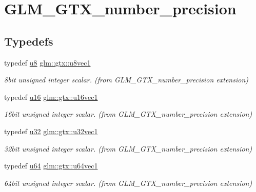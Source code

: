 \hypertarget{group__gtx__number__precision}{}\section{G\+L\+M\+\_\+\+G\+T\+X\+\_\+number\+\_\+precision}
\label{group__gtx__number__precision}
\subsection*{Typedefs}
\begin{DoxyCompactItemize}
\item 
typedef \mbox{\hyperlink{group__gtc__type__precision_ga5e3dc67373d5068997d2d9f41c9024d2}{u8}} \mbox{\hyperlink{group__gtx__number__precision_ga35ae7849593a354420e4f52d1b36c2d6}{glm\+::gtx\+::u8vec1}}
\begin{DoxyCompactList}\small\item\em 8bit unsigned integer scalar. (from G\+L\+M\+\_\+\+G\+T\+X\+\_\+number\+\_\+precision extension) \end{DoxyCompactList}\item 
typedef \mbox{\hyperlink{group__gtc__type__precision_gae7a1571503f83d2264ddfa705a6b082a}{u16}} \mbox{\hyperlink{group__gtx__number__precision_ga807d7e5f24e981b1575bd40ca159781d}{glm\+::gtx\+::u16vec1}}
\begin{DoxyCompactList}\small\item\em 16bit unsigned integer scalar. (from G\+L\+M\+\_\+\+G\+T\+X\+\_\+number\+\_\+precision extension) \end{DoxyCompactList}\item 
typedef \mbox{\hyperlink{group__gtc__type__precision_ga54e837745059fd29017bed71cfa0a8db}{u32}} \mbox{\hyperlink{group__gtx__number__precision_gac46a7890b20928df83e734c3ea9557d4}{glm\+::gtx\+::u32vec1}}
\begin{DoxyCompactList}\small\item\em 32bit unsigned integer scalar. (from G\+L\+M\+\_\+\+G\+T\+X\+\_\+number\+\_\+precision extension) \end{DoxyCompactList}\item 
typedef \mbox{\hyperlink{group__gtc__type__precision_ga71cedd4972f9cb1a5e14dfe5ab83ecd7}{u64}} \mbox{\hyperlink{group__gtx__number__precision_ga92812a1d7e746bcaba61d2f5a64afc52}{glm\+::gtx\+::u64vec1}}
\begin{DoxyCompactList}\small\item\em 64bit unsigned integer scalar. (from G\+L\+M\+\_\+\+G\+T\+X\+\_\+number\+\_\+precision extension) \end{DoxyCompactList}\item 

\end{DoxyCompactItemize}
